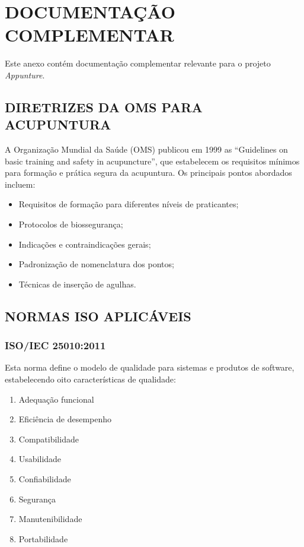 
\chapter{DOCUMENTAÇÃO COMPLEMENTAR} \label{ax:doc}

Este anexo contém documentação complementar relevante para o projeto \textit{Appunture}.

\section{DIRETRIZES DA OMS PARA ACUPUNTURA}

A Organização Mundial da Saúde (OMS) publicou em 1999 as ``Guidelines on basic training and safety in acupuncture'', que estabelecem os requisitos mínimos para formação e prática segura da acupuntura. Os principais pontos abordados incluem:

\begin{itemize}
    \item Requisitos de formação para diferentes níveis de praticantes;
    \item Protocolos de biossegurança;
    \item Indicações e contraindicações gerais;
    \item Padronização de nomenclatura dos pontos;
    \item Técnicas de inserção de agulhas.
\end{itemize}

\section{NORMAS ISO APLICÁVEIS}

\subsection{ISO/IEC 25010:2011}

Esta norma define o modelo de qualidade para sistemas e produtos de software, estabelecendo oito características de qualidade:

\begin{enumerate}
    \item Adequação funcional
    \item Eficiência de desempenho
    \item Compatibilidade
    \item Usabilidade
    \item Confiabilidade
    \item Segurança
    \item Manutenibilidade
    \item Portabilidade
\end{enumerate}

